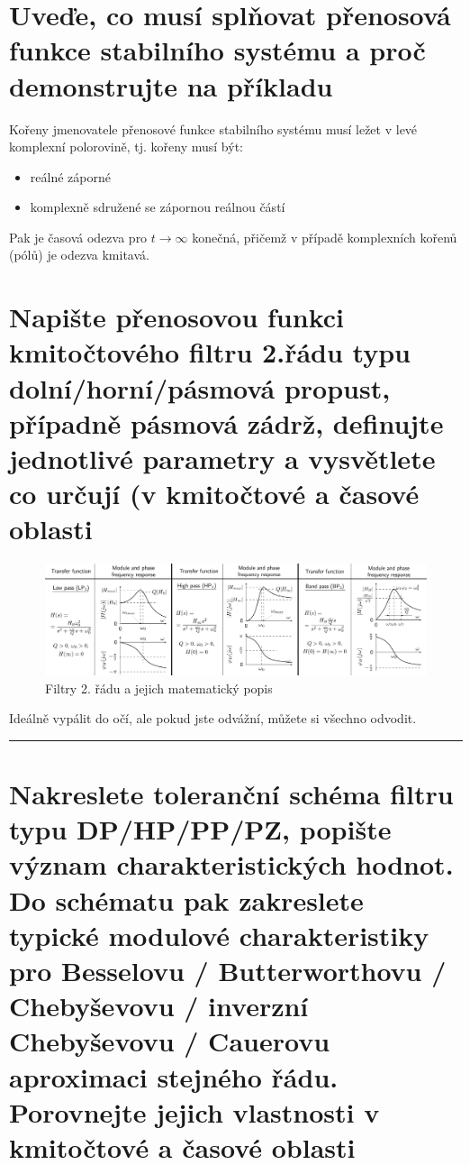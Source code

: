\documentclass[a4paper,12pt]{article}   %
\begin{document}
\section{Uveďe, co musí splňovat přenosová funkce stabilního systému a proč demonstrujte na příkladu}
Kořeny jmenovatele přenosové funkce stabilního systému musí ležet v levé komplexní polorovině, tj. kořeny musí být:
\begin{itemize}
    \item reálné záporné
    \item komplexně sdružené se zápornou reálnou částí
\end{itemize}
Pak je časová odezva pro $t\rightarrow\infty$ konečná, přičemž v případě komplexních kořenů (pólů) je odezva kmitavá.









\section{Napište přenosovou funkci kmitočtového filtru 2.řádu typu dolní/horní/pásmová propust, případně pásmová zádrž, definujte jednotlivé parametry a vysvětlete co určují (v kmitočtové a časové oblasti}
\begin{figure}[h!]
    \centering
    \includegraphics[width=\textwidth]{filtry_2_rad.png}
    \caption{Filtry 2. řádu a jejich matematický popis}
\end{figure}
Ideálně vypálit do očí, ale pokud jste odvážní, můžete si všechno odvodit.
 \\
\hrule%









\section{Nakreslete toleranční schéma filtru typu DP/HP/PP/PZ, popište význam charakteristických hodnot. Do schématu pak zakreslete typické modulové charakteristiky pro Besselovu / Butterworthovu / Chebyševovu / inverzní Chebyševovu / Cauerovu aproximaci stejného řádu. Porovnejte jejich vlastnosti v kmitočtové a časové oblasti}
\end{document}

